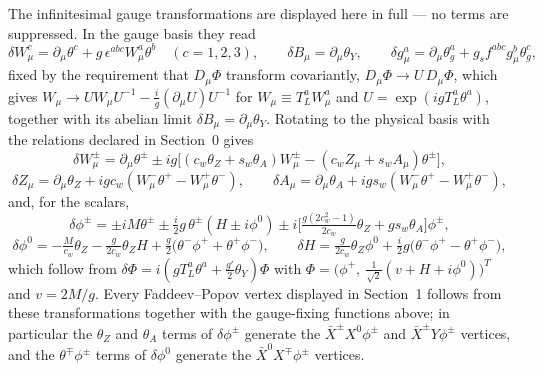 \documentclass{article}
\begin{document}
The infinitesimal gauge transformations are displayed here in full --- no terms are suppressed. In the
gauge basis they read
\[
\delta W_\mu^c = \partial_\mu \theta^c + g\, \epsilon^{abc} W_\mu^a \theta^b \quad (c = 1,2,3),
\qquad
\delta B_\mu = \partial_\mu \theta_Y,
\qquad
\delta g_\mu^a = \partial_\mu \theta_g^a + g_s f^{abc} g_\mu^b \theta_g^c ,
\]
fixed by the requirement that $D_\mu\Phi$ transform covariantly, $D_\mu\Phi \to U\, D_\mu\Phi$, which gives
$W_\mu \to U W_\mu U^{-1} - \tfrac{i}{g}(\partial_\mu U) U^{-1}$ for $W_\mu \equiv T_L^a W_\mu^a$ and
$U = \exp(i g T_L^a \theta^a)$, together with its abelian limit $\delta B_\mu = \partial_\mu \theta_Y$.
Rotating to the physical basis with the relations declared in Section~0 gives
\[
\delta W_\mu^\pm = \partial_\mu \theta^\pm
\pm i g \big[ (c_w \theta_Z + s_w \theta_A) W_\mu^\pm - (c_w Z_\mu + s_w A_\mu) \theta^\pm \big],
\]
\[
\delta Z_\mu = \partial_\mu \theta_Z + i g c_w (W_\mu^- \theta^+ - W_\mu^+ \theta^-),\qquad
\delta A_\mu = \partial_\mu \theta_A + i g s_w (W_\mu^- \theta^+ - W_\mu^+ \theta^-),
\]
and, for the scalars,
\[
\delta \phi^\pm = \pm i M \theta^\pm \pm \tfrac{i}{2} g\, \theta^\pm (H \pm i \phi^0)
\pm i \Big[ \tfrac{g (2 c_w^2 - 1)}{2 c_w} \theta_Z + g s_w \theta_A \Big] \phi^\pm,
\]
\[
\delta \phi^0 = -\tfrac{M}{c_w}\theta_Z - \tfrac{g}{2 c_w}\theta_Z H
+ \tfrac{g}{2} \big( \theta^- \phi^+ + \theta^+ \phi^- \big),\qquad
\delta H = \tfrac{g}{2 c_w}\theta_Z \phi^0
+ \tfrac{i}{2} g \big( \theta^- \phi^+ - \theta^+ \phi^- \big),
\]
which follow from $\delta \Phi = i\left(g T_L^a \theta^a + \tfrac{g'}{2}\theta_Y\right)\Phi$ with
$\Phi = \big(\phi^+,\ \tfrac{1}{\sqrt2}(v + H + i\phi^0)\big)^T$ and $v = 2M/g$.
Every Faddeev--Popov vertex displayed in Section~1 follows from these transformations together with the
gauge-fixing functions above; in particular the $\theta_Z$ and $\theta_A$ terms of $\delta\phi^\pm$ generate
the $\bar X^\pm X^0 \phi^\pm$ and $\bar X^\pm Y \phi^\pm$ vertices, and the $\theta^\mp \phi^\pm$ terms of
$\delta\phi^0$ generate the $\bar X^0 X^\mp \phi^\pm$ vertices.
\end{document}
